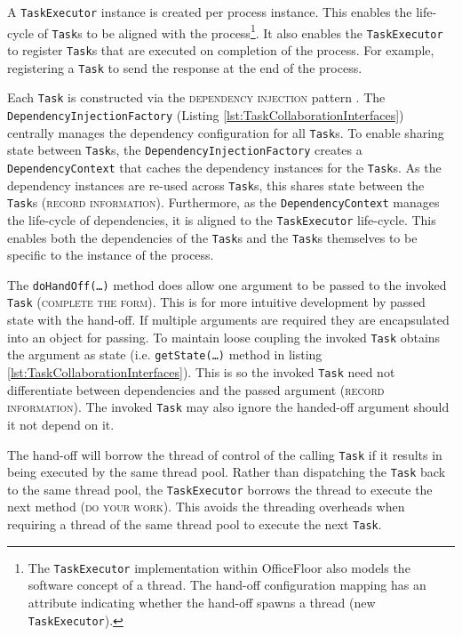 \documentclass[prodmode]{style/acmlarge}
\begin{document}
A \texttt{TaskExecutor} instance is created per process instance.  This enables
the life-cycle of \texttt{Task}s to be aligned with the process\footnote{The
\texttt{TaskExecutor} implementation within OfficeFloor also models the software
concept of a thread.  The hand-off configuration mapping has an attribute
indicating whether the hand-off spawns a thread (new \texttt{TaskExecutor}).}.
It also enables the \texttt{TaskExecutor} to register \texttt{Task}s that are
executed on completion of the process.  For example, registering a \texttt{Task}
to send the response at the end of the process.

Each \texttt{Task} is constructed via the \textsc{dependency injection} pattern
\cite{ioc}.  The \texttt{Dependency\-InjectionFactory} (Listing
\ref{lst:TaskCollaborationInterfaces}) centrally manages the dependency
configuration for all \texttt{Task}s.  To enable sharing state between
\texttt{Task}s, the \texttt{Dependency\-InjectionFactory} creates a
\texttt{Depend\-ency\-Context} that caches the dependency instances for the
\texttt{Task}s.  As the dependency instances are re-used across \texttt{Task}s,
this shares state between the \texttt{Task}s (\textsc{record information}).
Furthermore, as the \texttt{Dependency\-Context} manages the life-cycle of
dependencies, it is aligned to the \texttt{TaskExecutor} life-cycle.
This enables both the dependencies of the \texttt{Task}s and the \texttt{Task}s
themselves to be specific to the instance of the process.

The \texttt{doHandOff(\ldots)} method does allow one argument to be passed to
the invoked \texttt{Task} (\textsc{complete the form}).  This is for more
intuitive development by passed state with the hand-off.  If multiple arguments
are required they are encapsulated into an object for passing.  To maintain
loose coupling the invoked \texttt{Task} obtains the argument as state (i.e.
\texttt{getState(\ldots)} method in listing
\ref{lst:TaskCollaborationInterfaces}).  This is so the invoked \texttt{Task}
need not differentiate between dependencies and the passed argument
(\textsc{record information}).  The invoked \texttt{Task} may also ignore the
handed-off argument should it not depend on it.

The hand-off will borrow the thread of control of the calling \texttt{Task} if
it results in being executed by the same thread pool.  Rather than dispatching
the \texttt{Task} back to the same thread pool, the \texttt{TaskExecutor}
borrows the thread to execute the next method (\textsc{do your work}). This
avoids the threading overheads when requiring a thread of the same thread pool
to execute the next \texttt{Task}.
\end{document}
